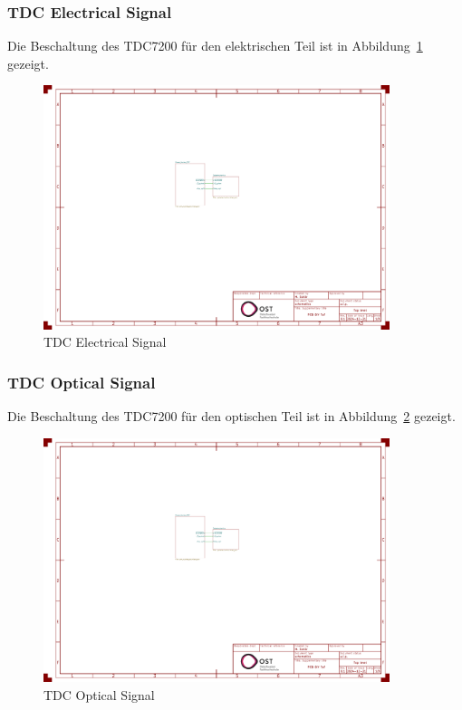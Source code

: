\documentclass[11pt,a4paper,hidelinks]{article}
\begin{document}
\subsubsection{TDC Electrical Signal}

Die Beschaltung des TDC7200 \cite{ti2016tdc7200_datasheet} für den elektrischen Teil ist in Abbildung~\ref{fig:tdc_ele_signal} gezeigt.

\begin{figure}[H]
    \centering
    \includegraphics[page=2, trim=80 330 750 310, clip, width=0.9\textwidth]{attachments/schematic.pdf}
    \caption{TDC Electrical Signal}\label{fig:tdc_ele_signal}
\end{figure}

\subsubsection{TDC Optical Signal}

Die Beschaltung des TDC7200 \cite{ti2016tdc7200_datasheet} für den optischen Teil ist in Abbildung~\ref{fig:tdc_opt_signal} gezeigt.

\begin{figure}[H]
    \centering
    \includegraphics[page=2, trim=530 330 300 310, clip, width=0.9\textwidth]{attachments/schematic.pdf}
    \caption{TDC Optical Signal}\label{fig:tdc_opt_signal}
\end{figure}
\end{document}
